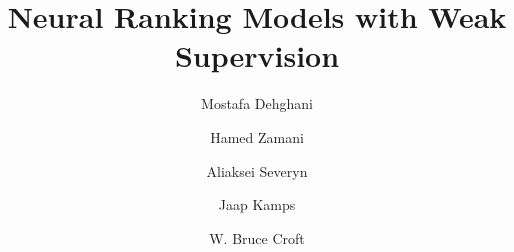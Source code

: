 \documentclass[sigconf]{acmart}
\begin{document}
\title{Neural Ranking Models with Weak Supervision} 


\author{Mostafa Dehghani}

\author{Hamed Zamani}

\author{Aliaksei Severyn}


\author{Jaap Kamps}

\author{W. Bruce Croft}

\renewcommand{\shortauthors}{M. Dehghani et al.}

\newcommand{\maingoal}{to study the impact of weak supervision on neural ranking models}
\newcommand{\rqone}{Is it possible to learn a neural ranker only from labels provided by a completely unsupervised IR model such as BM25, as the weak supervision signal, that will exhibit superior generalization capabilities?}
\newcommand{\rqtwo}{What input representation and learning objective is most suitable for learning in such a setting?}
\newcommand{\rqthree}{Can a supervised learning model benefit from a weak supervision step, especially in cases when labeled data is limited?}
%
\renewcommand{\rqone}{Can labels from an unsupervised IR model such as BM25 be used as weak supervision signal to train an effective neural ranker?}
\end{document}
